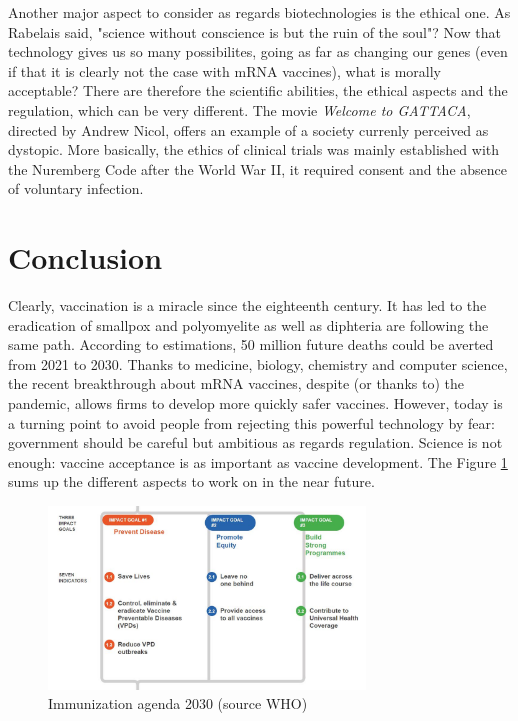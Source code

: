 \documentclass{article}
\begin{document}
        Another major aspect to consider as regards biotechnologies is the ethical one.
        As Rabelais said, "science without conscience is but the ruin of the soul"?
        Now that technology gives us so many possibilites, 
        going as far as changing our genes (even if that it is clearly not the case with mRNA vaccines), what is morally acceptable? 
        There are therefore the scientific abilities, the ethical aspects and the regulation, which can be very different.
        The movie \emph{Welcome to GATTACA}, directed by Andrew Nicol, offers an example of a society currenly perceived as dystopic.
        More basically, the ethics of clinical trials was mainly established with the Nuremberg Code after the World War II,
            it required consent and the absence of voluntary infection.
        
    \section{Conclusion}

        Clearly, vaccination is a miracle since the eighteenth century.
        It has led to the eradication of smallpox and polyomyelite as well as diphteria are following the same path.
        According to estimations, 50 million future deaths could be averted from 2021 to 2030.
        Thanks to medicine, biology, chemistry and computer science, 
            the recent breakthrough about mRNA vaccines, despite (or thanks to) the pandemic, allows firms to develop more quickly safer vaccines.
        However, today is a turning point to avoid people from rejecting this powerful technology by fear: government should be careful but ambitious
            as regards regulation. 
            Science is not enough: vaccine acceptance is as important as vaccine development.
            The Figure \ref{fig:agenda2} sums up the different aspects to work on in the near future.

        \begin{figure}
            \centering
            \includegraphics[width=0.75\textwidth]{imgs/Objectives.JPG}
            \caption{Immunization agenda 2030 (source WHO)}
            \label{fig:agenda2}
        \end{figure}  
\end{document}
